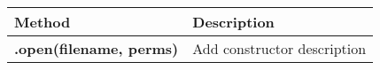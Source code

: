 \documentclass[a4paper,11pt]{report}
\begin{document}
\begin{appendix}
\begin{table}[h]
\begin{tabular}{p{4cm} p{10cm}}
\end{tabular}
\end{table}

\begin{table}[h]
\begin{tabular}{l p{10cm}}
\textbf{Method} & \textbf{Description}  \\ \hline
\textbf{.open(filename, perms)} & Add constructor description \\

\end{tabular}
\end{table}

\end{appendix}







\end{document}
